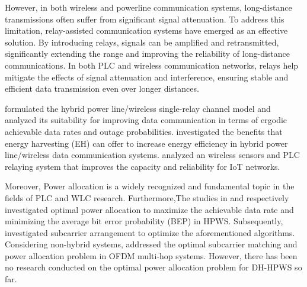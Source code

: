 \documentclass[lettersize,journal]{IEEEtran}
\begin{document}
	However, in both wireless and powerline communication systems, long-distance transmissions often suffer from significant signal attenuation. To address this limitation, relay-assisted communication systems have emerged as an effective solution. By introducing relays, signals can be amplified and retransmitted, significantly extending the range and improving the reliability of long-distance communications. In both PLC and wireless communication networks, relays help mitigate the effects of signal attenuation and interference, ensuring stable and efficient data transmission even over longer distances.
	
	\cite{8187635} formulated the hybrid power line/wireless single-relay channel model and analyzed its suitability for improving data communication in terms of ergodic achievable data rates and outage probabilities.\cite{8421566} investigated the benefits that energy harvesting (EH) can offer to increase energy efficiency in hybrid power line/wireless data communication systems.\cite{7973142} analyzed an wireless sensors and PLC relaying system that improves the capacity and reliability for IoT networks. 
	
	Moreover, Power allocation is a widely recognized and fundamental topic in the fields of PLC and WLC research.	Furthermore,The studies in \cite{9122404} and \cite{9665745} respectively investigated optimal power allocation to maximize the achievable data rate and minimizing the average bit error probability (BEP) in HPWS. Subsequently, \cite{9815250} investigated subcarrier arrangement to optimize the aforementioned algorithms. Considering non-hybrid systems, \cite{5071270} addressed the optimal subcarrier matching and power allocation problem in OFDM multi-hop systems. However, there has been no research conducted on the optimal power allocation problem for DH-HPWS so far.
	
\end{document}
